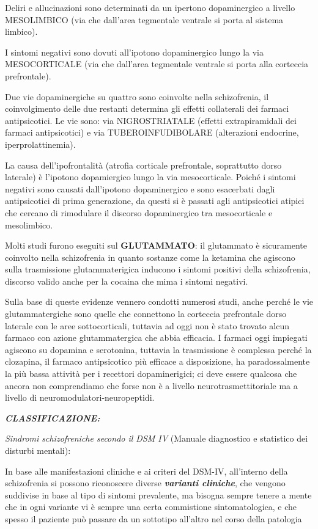 \documentclass[]{article}
\begin{document}
Deliri e allucinazioni sono determinati da un ipertono dopaminergico a
livello MESOLIMBICO (via che dall'area tegmentale ventrale si porta al
sistema limbico).

I sintomi negativi sono dovuti all'ipotono dopaminergico lungo la via
MESOCORTICALE (via che dall'area tegmentale ventrale si porta alla
corteccia prefrontale).

Due vie dopaminergiche su quattro sono coinvolte nella schizofrenia, il
coinvolgimento delle due restanti determina gli effetti collaterali dei
farmaci antipsicotici. Le vie sono: via NIGROSTRIATALE (effetti
extrapiramidali dei farmaci antipsicotici) e via TUBEROINFUDIBOLARE
(alterazioni endocrine, iperprolattinemia).

La causa dell'ipofrontalità (atrofia corticale prefrontale, soprattutto
dorso laterale) è l'ipotono dopamiergico lungo la via mesocorticale.
Poiché i sintomi negativi sono causati dall'ipotono dopaminergico e sono
esacerbati dagli antipsicotici di prima generazione, da questi si è
passati agli antipsicotici atipici che cercano di rimodulare il discorso
dopaminergico tra mesocorticale e mesolimbico.

Molti studi furono eseguiti sul \textbf{GLUTAMMATO}: il glutammato è
sicuramente coinvolto nella schizofrenia in quanto sostanze come la
ketamina che agiscono sulla trasmissione glutammaterigica inducono i
sintomi positivi della schizofrenia, discorso valido anche per la
cocaina che mima i sintomi negativi.

Sulla base di queste evidenze vennero condotti numerosi studi, anche
perché le vie glutammatergiche sono quelle che connettono la corteccia
prefrontale dorso laterale con le aree sottocorticali, tuttavia ad oggi
non è stato trovato alcun farmaco con azione glutammatergica che abbia
efficacia. I farmaci oggi impiegati agiscono su dopamina e serotonina,
tuttavia la trasmissione è complessa perché la clozapina, il farmaco
antipsicotico più efficace a disposizione, ha paradossalmente la più
bassa attività per i recettori dopaminerigici; ci deve essere qualcosa
che ancora non comprendiamo che forse non è a livello
neurotrasmettitoriale ma a livello di neuromodulatori-neuropeptidi.

\textbf{\emph{CLASSIFICAZIONE:}}

\emph{Sindromi schizofreniche secondo il DSM IV} (Manuale diagnostico e
statistico dei disturbi mentali):

In base alle manifestazioni cliniche e ai criteri del DSM-IV,
all'interno della schizofrenia si possono riconoscere diverse
\textbf{\emph{varianti cliniche}}, che vengono suddivise in base al tipo
di sintomi prevalente, ma bisogna sempre tenere a mente che in ogni
variante vi è sempre una certa commistione sintomatologica, e che spesso
il paziente può passare da un sottotipo all'altro nel corso della
patologia
\end{document}
